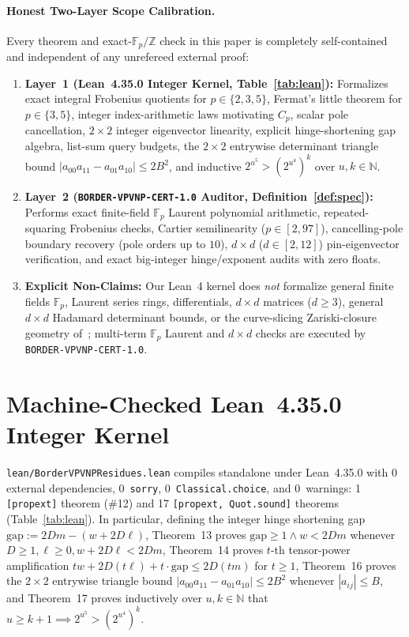 \documentclass[10pt,twocolumn]{article}
\newcommand{\ZZ}{\mathbb{Z}}
\newcommand{\NN}{\mathbb{N}}
\newcommand{\FF}{\mathbb{F}}
\newcommand{\certschema}{\texttt{BORDER-VPVNP-CERT-1.0}}
\begin{document}
\paragraph{Honest Two-Layer Scope Calibration.}
Every theorem and exact-$\FF_p/\ZZ$ check in this paper is completely self-contained and independent of any unrefereed external proof:
\begin{enumerate}[leftmargin=1.2em,itemsep=1pt,topsep=2pt]
  \item \textbf{Layer~1 (Lean~4.35.0 Integer Kernel, Table~\ref{tab:lean}):} Formalizes exact integral Frobenius quotients for $p\in\{2,3,5\}$, Fermat's little theorem for $p\in\{3,5\}$, integer index-arithmetic laws motivating $C_p$, scalar pole cancellation, $2\times 2$ integer eigenvector linearity, explicit hinge-shortening gap algebra, list-sum query budgets, the $2\times 2$ entrywise determinant triangle bound $|a_{00}a_{11}-a_{01}a_{10}|\le 2B^2$, and inductive $2^{u^5} > (2^{u^4})^k$ over $u,k\in\NN$.
  \item \textbf{Layer~2 (\certschema{} Auditor, Definition~\ref{def:spec}):} Performs exact finite-field $\FF_p$ Laurent polynomial arithmetic, repeated-squaring Frobenius checks, Cartier semilinearity ($p\in[2,97]$), cancelling-pole boundary recovery (pole orders up to $10$), $d\times d$ ($d\in[2,12]$) pin-eigenvector verification, and exact big-integer hinge/exponent audits with zero floats.
  \item \textbf{Explicit Non-Claims:} Our Lean~4 kernel does \emph{not} formalize general finite fields $\FF_p$, Laurent series rings, differentials, $d\times d$ matrices ($d\ge 3$), general $d\times d$ Hadamard determinant bounds, or the curve-slicing Zariski-closure geometry of~\cite{openai2026vpvnp}; multi-term $\FF_p$ Laurent and $d\times d$ checks are executed by \certschema{}.
\end{enumerate}

\section{Machine-Checked Lean~4.35.0 Integer Kernel}\label{sec:lean}
\texttt{lean/BorderVPVNPResidues.lean} compiles standalone under Lean~4.35.0 with $0$ external dependencies, $0$~\texttt{sorry}, $0$~\texttt{Classical.choice}, and $0$~warnings: 1 \texttt{[propext]} theorem (\#12) and 17 \texttt{[propext, Quot.sound]} theorems (Table~\ref{tab:lean}). In particular, defining the integer hinge shortening gap $\mathrm{gap} := 2Dm - (w + 2D\ell)$, Theorem~13 proves $\mathrm{gap}\ge 1 \wedge w < 2Dm$ whenever $D\ge 1, \ell\ge 0, w+2D\ell < 2Dm$, Theorem~14 proves $t$-th tensor-power amplification $tw + 2D(t\ell) + t\cdot\mathrm{gap} \le 2D(tm)$ for $t\ge 1$, Theorem~16 proves the $2\times 2$ entrywise triangle bound $|a_{00}a_{11}-a_{01}a_{10}|\le 2B^2$ whenever $|a_{ij}|\le B$, and Theorem~17 proves inductively over $u,k\in\NN$ that $u\ge k+1 \implies 2^{u^5} > (2^{u^4})^k$.
\end{document}

